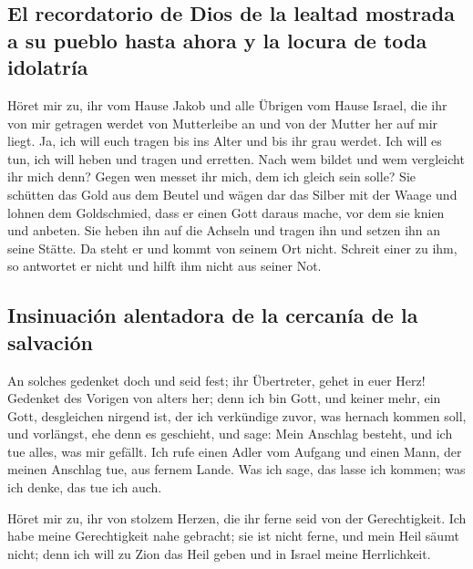 \hypertarget{el-recordatorio-de-dios-de-la-lealtad-mostrada-a-su-pueblo-hasta-ahora-y-la-locura-de-toda-idolatruxeda}{%
\subsection{El recordatorio de Dios de la lealtad mostrada a su pueblo
hasta ahora y la locura de toda
idolatría}\label{el-recordatorio-de-dios-de-la-lealtad-mostrada-a-su-pueblo-hasta-ahora-y-la-locura-de-toda-idolatruxeda}}

 Höret mir zu, ihr vom Hause Jakob und alle Übrigen vom
Hause Israel, die ihr von mir getragen werdet von Mutterleibe an und von
der Mutter her auf mir liegt.  Ja, ich will euch tragen
bis ins Alter und bis ihr grau werdet. Ich will es tun, ich will heben
und tragen und erretten.  Nach wem bildet und wem
vergleicht ihr mich denn? Gegen wen messet ihr mich, dem ich gleich sein
solle?  Sie schütten das Gold aus dem Beutel und wägen dar
das Silber mit der Waage und lohnen dem Goldschmied, dass er einen Gott
daraus mache, vor dem sie knien und anbeten.  Sie heben
ihn auf die Achseln und tragen ihn und setzen ihn an seine Stätte. Da
steht er und kommt von seinem Ort nicht. Schreit einer zu ihm, so
antwortet er nicht und hilft ihm nicht aus seiner Not.

\hypertarget{insinuaciuxf3n-alentadora-de-la-cercanuxeda-de-la-salvaciuxf3n}{%
\subsection{Insinuación alentadora de la cercanía de la
salvación}\label{insinuaciuxf3n-alentadora-de-la-cercanuxeda-de-la-salvaciuxf3n}}

 An solches gedenket doch und seid fest; ihr Übertreter,
gehet in euer Herz!  Gedenket des Vorigen von alters her;
denn ich bin Gott, und keiner mehr, ein Gott, desgleichen nirgend ist,
 der ich verkündige zuvor, was hernach kommen soll, und
vorlängst, ehe denn es geschieht, und sage: Mein Anschlag besteht, und
ich tue alles, was mir gefällt.  Ich rufe einen Adler vom
Aufgang und einen Mann, der meinen Anschlag tue, aus fernem Lande. Was
ich sage, das lasse ich kommen; was ich denke, das tue ich auch.

 Höret mir zu, ihr von stolzem Herzen, die ihr ferne seid
von der Gerechtigkeit.  Ich habe meine Gerechtigkeit nahe
gebracht; sie ist nicht ferne, und mein Heil säumt nicht; denn ich will
zu Zion das Heil geben und in Israel meine Herrlichkeit.

